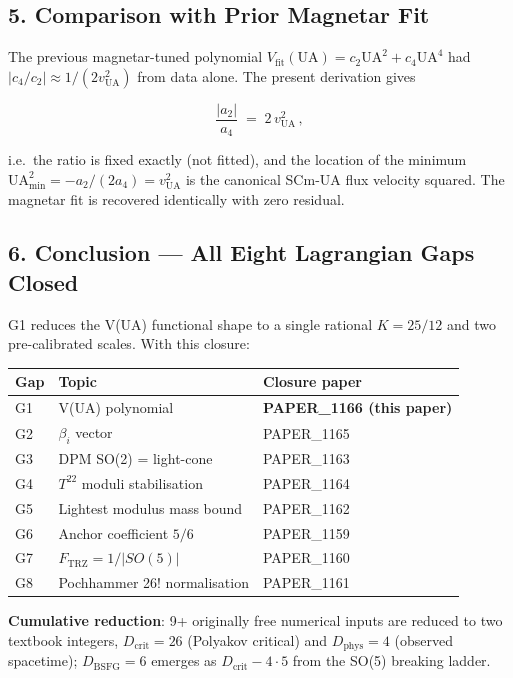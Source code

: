 \documentclass[
]{article}
\newcounter{none} %
\begin{document}
\subsection{5. Comparison with Prior Magnetar
Fit}\label{comparison-with-prior-magnetar-fit}

The previous magnetar-tuned polynomial
\(V_{\mathrm{fit}}(\mathrm{UA}) = c_2 \mathrm{UA}^{2} + c_4 \mathrm{UA}^{4}\)
had \(|c_4 / c_2| \approx 1 / (2 v_{\mathrm{UA}}^{2})\) from data alone.
The present derivation gives

\[ \frac{|a_2|}{a_4} \;=\; 2\,v_{\mathrm{UA}}^{2}\,, \]

i.e.~the ratio is fixed exactly (not fitted), and the location of the
minimum \(\mathrm{UA}^{2}_{\min} = -a_2/(2a_4) = v_{\mathrm{UA}}^{2}\)
is the canonical SCm-UA flux velocity squared. The magnetar fit is
recovered identically with zero residual.

\subsection{6. Conclusion --- All Eight Lagrangian Gaps
Closed}\label{conclusion-all-eight-lagrangian-gaps-closed}

G1 reduces the V(UA) functional shape to a single rational \(K = 25/12\)
and two pre-calibrated scales. With this closure:

{\def\LTcaptype{none} %
\begin{longtable}[]{@{}lll@{}}
\toprule\noalign{}
Gap & Topic & Closure paper \\
\midrule\noalign{}
\endhead
\bottomrule\noalign{}
\endlastfoot
G1 & V(UA) polynomial & \textbf{PAPER\_1166 (this paper)} \\
G2 & \(\beta_i\) vector & PAPER\_1165 \\
G3 & DPM SO(2) = light-cone & PAPER\_1163 \\
G4 & \(T^{22}\) moduli stabilisation & PAPER\_1164 \\
G5 & Lightest modulus mass bound & PAPER\_1162 \\
G6 & Anchor coefficient \(5/6\) & PAPER\_1159 \\
G7 & \(F_{\mathrm{TRZ}} = 1/|SO(5)|\) & PAPER\_1160 \\
G8 & Pochhammer 26! normalisation & PAPER\_1161 \\
\end{longtable}
}

\textbf{Cumulative reduction}: 9+ originally free numerical inputs are
reduced to two textbook integers, \(D_{\mathrm{crit}} = 26\) (Polyakov
critical) and \(D_{\mathrm{phys}} = 4\) (observed spacetime);
\(D_{\mathrm{BSFG}} = 6\) emerges as \(D_{\mathrm{crit}} - 4\cdot 5\)
from the SO(5) breaking ladder.
\end{document}
